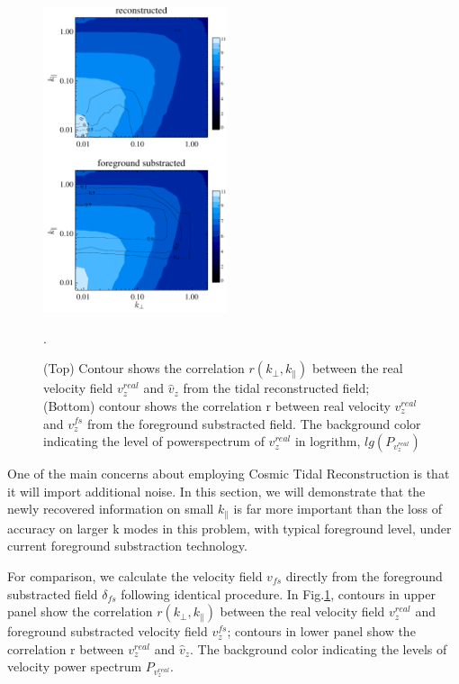 \begin{figure}[tbp]
	\begin{center}
		\includegraphics[width=0.48\textwidth]{vmode.pdf}
	\end{center}
	\vspace{-0.7cm}
	\caption{(Top) Contour shows the correlation $r(k_\perp,k_\parallel)$ between the real velocity field $v_z^{real}$ and $\hat v_z$ from the tidal reconstructed field; 
(Bottom) contour shows the correlation r between real velocity $v_z^{real}$ and $v_z^{fs}$ from the foreground substracted field. 
The background color indicating the level of powerspectrum of $v_z^{real}$ in logrithm, $lg(P_{v_z^{real}})$}. 
\label{fig:vmode}
\end{figure}

One of the main concerns about employing Cosmic Tidal Reconstruction is that it will import additional noise.
In this section, we will demonstrate that 
the newly recovered information on small $k_\parallel$ is far
more important than the loss of accuracy on larger k modes in this
problem, with typical foreground level, under current foreground substraction technology.

For comparison, we calculate the velocity field $v_{fs}$
directly from the foreground substracted field $\delta_{fs}$ following identical procedure.
In Fig.\ref{fig:vmode}, contours in upper panel show the 
correlation $r(k_\perp,k_\parallel)$ between the real velocity field
$v_z^{real}$ and foreground substracted velocity field $v_z^{fs}$; 
contours in lower panel show the
correlation r between $v_z^{real}$ and $\hat v_z$. 
The background color indicating the levels of velocity power spectrum
$P_{v_z^{real}}$. 


